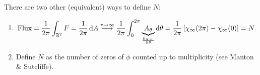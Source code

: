 \documentclass[a4paper,11pt]{article}
\begin{document}
    There are two other (equivalent) ways to define $N$:
    \begin{enumerate}[1)]
        \item \begin{equation}
            \text{Flux} = \frac{1}{2 \pi} \int_{\mathbb{R}^2} F = \frac{1}{2 \pi} \dd{A} \overset{r \to \infty}{\longrightarrow} \frac{1}{2 \pi} \int_{0}^{2 \pi} \underbrace{A_\theta}_{\pdv{\chi_\infty }{\theta}} \dd{\theta} = \frac{1}{2 \pi}\left[ \chi_\infty (2 \pi) - \chi_\infty(0) \right] = N.
        \end{equation}
        \item Define $N$ as the number of zeros of $\phi$ counted up to multiplicity (see Manton \& Sutcliffe).
        \begin{center}
            


\begin{tikzpicture}[x=0.75pt,y=0.75pt,yscale=-1,xscale=1]


\end{tikzpicture}
\end{center}
\end{enumerate}
\end{document}
